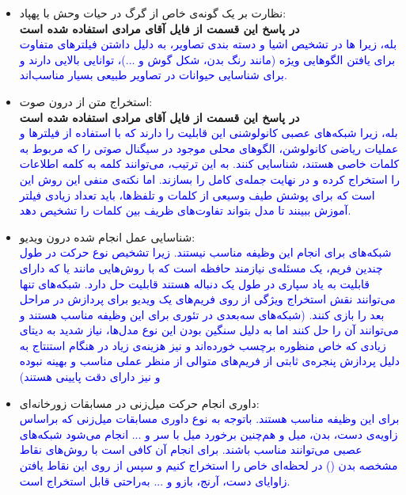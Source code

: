 \documentclass[12pt]{article}
\begin{document}
\begin{enumerate}
\begin{enumerate}
\begin{itemize}
            \item نظارت بر یک گونه‌ی خاص از گرگ در حیات وحش با پهپاد:\\
            \textbf{در پاسخ این قسمت از فایل آقای مرادی استفاده شده است}\\
            \textcolor{blue}{
            بله، زیرا ها در تشخیص اشیا و دسته بندی تصاویر، به دلیل داشتن فیلترهای متفاوت برای یافتن الگوهایی ویژه (مانند رنگ بدن، شکل گوش و ...)، توانایی بالایی دارند و برای شناسایی حیوانات در تصاویر طبیعی بسیار مناسب‌اند.
            }
            \item استخراج متن از درون صوت:\\
            \textbf{در پاسخ این قسمت از فایل آقای مرادی استفاده شده است}\\
            \textcolor{blue}{
            بله، زیرا شبکه‌های عصبی کانولوشنی این قابلیت را دارند که با استفاده از فیلترها و عملیات ریاضی کانولوشن، الگوهای محلی موجود در سیگنال صوتی را که مربوط به کلمات خاصی هستند، شناسایی کنند. به این ترتیب، می‌توانند کلمه به کلمه اطلاعات را استخراج کرده و در نهایت جمله‌ی کامل را بسازند. اما نکته‌ی منفی این روش این است که برای پوشش طیف وسیعی از کلمات و تلفظ‌ها، باید تعداد زیادی فیلتر آموزش ببینند تا مدل بتواند تفاوت‌های ظریف بین کلمات را تشخیص دهد.}
            \item شناسایی عمل انجام شده درون ویدیو:\\
            \textcolor{blue}{
            شبکه‌های  برای انجام این وظیفه مناسب نیستند. زیرا تشخیص نوع حرکت در طول چندین فریم، یک مسئله‌ی نیازمند حافظه است که با روش‌هایی مانند  یا  که دارای قابلیت به یاد سپاری در طول یک دنباله هستند قابلیت حل دارد. شبکه‌های  تنها می‌توانند نقش استخراج ویژگی از روی فریم‌های یک ویدیو برای پردازش در مراحل بعد را بازی کنند. (شبکه‌های  سه‌بعدی در تئوری برای این وظیفه مناسب هستند و می‌توانند آن را حل کنند اما به دلیل سنگین بودن این نوع مدل‌ها، نیاز شدید به دیتای زیادی که خاص منظوره برچسب خورده‌اند و نیز هزینه‌ی زیاد در هنگام استنتاج به دلیل پردازش پنجره‌ی ثابتی از فریم‌های متوالی از منظر عملی مناسب و بهینه نبوده و نیز دارای دقت پایینی هستند)
            }
            \item داوری انجام حرکت میل‌زنی در مسابقات زورخانه‌ای:\\
            \textcolor{blue}{
            برای این وظیفه مناسب هستند. باتوجه به نوع داوری مسابقات میل‌زنی که براساس زاویه‌ی دست، بدن، میل و هم‌چنین برخورد میل با سر و ... انجام می‌شود شبکه‌های عصبی  می‌توانند مناسب باشند. برای انجام آن کافی است با روش‌های  نقاط مشخصه بدن () در لحظه‌ای خاص را استخراج کنیم و سپس از روی این نقاط یافتن زاوایای دست، آرنج، بازو و ... به‌راحتی قابل استخراج است.
}
\end{itemize}
\end{enumerate}
\end{enumerate}
\end{document}
